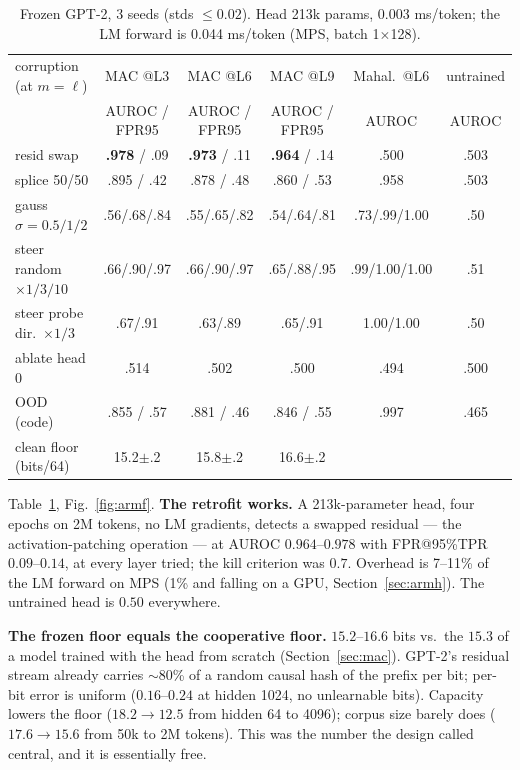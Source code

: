 \documentclass[10pt,twocolumn]{article}
\begin{document}
\begin{table}[t]
\centering\small
\begin{tabular}{l ccc c c}
\toprule
corruption (at $m{=}\ell$) & MAC @L3 & MAC @L6 & MAC @L9 & Mahal.\ @L6 & untrained\\
& AUROC / FPR95 & AUROC / FPR95 & AUROC / FPR95 & AUROC & AUROC\\
\midrule
resid swap & \textbf{.978} / .09 & \textbf{.973} / .11 & \textbf{.964} / .14 & .500 & .503\\
splice 50/50 & .895 / .42 & .878 / .48 & .860 / .53 & .958 & .503\\
gauss $\sigma{=}0.5/1/2$ & .56/.68/.84 & .55/.65/.82 & .54/.64/.81 & .73/.99/1.00 & .50\\
steer random $\times1/3/10$ & .66/.90/.97 & .66/.90/.97 & .65/.88/.95 & .99/1.00/1.00 & .51\\
steer probe dir.\ $\times1/3$ & .67/.91 & .63/.89 & .65/.91 & 1.00/1.00 & .50\\
ablate head 0 & .514 & .502 & .500 & .494 & .500\\
OOD (code) & .855 / .57 & .881 / .46 & .846 / .55 & .997 & .465\\
\midrule
clean floor (bits/64) & 15.2$\pm$.2 & 15.8$\pm$.2 & 16.6$\pm$.2 & & \\
\bottomrule
\end{tabular}
\caption{Frozen GPT-2, 3 seeds (stds $\le0.02$). Head 213k params, 0.003 ms/token; the LM
forward is 0.044 ms/token (MPS, batch 1$\times$128).}
\label{tab:armf}
\end{table}

Table~\ref{tab:armf}, Fig.~\ref{fig:armf}. \textbf{The retrofit works.} A 213k-parameter
head, four epochs on 2M tokens, no LM gradients, detects a swapped residual --- the
activation-patching operation --- at AUROC $0.964$--$0.978$ with FPR@95\%TPR
$0.09$--$0.14$, at every layer tried; the kill criterion was $0.7$. Overhead is 7--11\%
of the LM forward on MPS (1\% and falling on a GPU, Section~\ref{sec:armh}). The
untrained head is $0.50$ everywhere.

\textbf{The frozen floor equals the cooperative floor.} $15.2$--$16.6$ bits vs.\ the
$15.3$ of a model trained with the head from scratch (Section~\ref{sec:mac}). GPT-2's
residual stream already carries $\sim$80\% of a random causal hash of the prefix per
bit; per-bit error is uniform ($0.16$--$0.24$ at hidden 1024, no unlearnable bits).
Capacity lowers the floor ($18.2\to12.5$ from hidden 64 to 4096); corpus size barely
does ($17.6\to15.6$ from 50k to 2M tokens). This was the number the design called
central, and it is essentially free.
\end{document}

